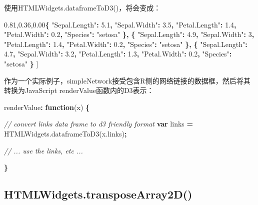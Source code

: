 \documentclass[]{book}
\newenvironment{Shaded}{\begin{snugshade}}{\end{snugshade}}
\newcommand{\KeywordTok}[1]{\textcolor[rgb]{0.13,0.29,0.53}{\textbf{#1}}}
\newcommand{\DecValTok}[1]{\textcolor[rgb]{0.00,0.00,0.81}{#1}}
\newcommand{\FloatTok}[1]{\textcolor[rgb]{0.00,0.00,0.81}{#1}}
\newcommand{\StringTok}[1]{\textcolor[rgb]{0.31,0.60,0.02}{#1}}
\newcommand{\CommentTok}[1]{\textcolor[rgb]{0.56,0.35,0.01}{\textit{#1}}}
\newcommand{\VariableTok}[1]{\textcolor[rgb]{0.00,0.00,0.00}{#1}}
\newcommand{\OperatorTok}[1]{\textcolor[rgb]{0.81,0.36,0.00}{\textbf{#1}}}
\newcommand{\AttributeTok}[1]{\textcolor[rgb]{0.77,0.63,0.00}{#1}}
\newcommand{\NormalTok}[1]{#1}
\theoremstyle{definition}
\theoremstyle{definition}
\theoremstyle{definition}
\theoremstyle{remark}
\begin{document}
使用HTMLWidgets.dataframeToD3()，将会变成：

\begin{Shaded}
\begin{Highlighting}[]
\NormalTok{[}
  \OperatorTok{\{}
    \StringTok{"Sepal.Length"}\OperatorTok{:} \FloatTok{5.1}\OperatorTok{,}
    \StringTok{"Sepal.Width"}\OperatorTok{:} \FloatTok{3.5}\OperatorTok{,}
    \StringTok{"Petal.Length"}\OperatorTok{:} \FloatTok{1.4}\OperatorTok{,}
    \StringTok{"Petal.Width"}\OperatorTok{:} \FloatTok{0.2}\OperatorTok{,}
    \StringTok{"Species"}\OperatorTok{:} \StringTok{"setosa"}
  \OperatorTok{\},}
  \OperatorTok{\{}
    \StringTok{"Sepal.Length"}\OperatorTok{:} \FloatTok{4.9}\OperatorTok{,}
    \StringTok{"Sepal.Width"}\OperatorTok{:} \DecValTok{3}\OperatorTok{,}
    \StringTok{"Petal.Length"}\OperatorTok{:} \FloatTok{1.4}\OperatorTok{,}
    \StringTok{"Petal.Width"}\OperatorTok{:} \FloatTok{0.2}\OperatorTok{,}
    \StringTok{"Species"}\OperatorTok{:} \StringTok{"setosa"}
  \OperatorTok{\},}
  \OperatorTok{\{}
    \StringTok{"Sepal.Length"}\OperatorTok{:} \FloatTok{4.7}\OperatorTok{,}
    \StringTok{"Sepal.Width"}\OperatorTok{:} \FloatTok{3.2}\OperatorTok{,}
    \StringTok{"Petal.Length"}\OperatorTok{:} \FloatTok{1.3}\OperatorTok{,}
    \StringTok{"Petal.Width"}\OperatorTok{:} \FloatTok{0.2}\OperatorTok{,}
    \StringTok{"Species"}\OperatorTok{:} \StringTok{"setosa"}
  \OperatorTok{\}}
\NormalTok{] }
\end{Highlighting}
\end{Shaded}

作为一个实际例子，simpleNetwork接受包含R侧的网络链接的数据框，然后将其转换为JavaScript
renderValue函数内的D3表示：

\begin{Shaded}
\begin{Highlighting}[]
\NormalTok{renderValue}\OperatorTok{:} \KeywordTok{function}\NormalTok{(x) }\OperatorTok{\{}

  \CommentTok{// convert links data frame to d3 friendly format}
  \KeywordTok{var}\NormalTok{ links }\OperatorTok{=} \VariableTok{HTMLWidgets}\NormalTok{.}\AttributeTok{dataframeToD3}\NormalTok{(}\VariableTok{x}\NormalTok{.}\AttributeTok{links}\NormalTok{)}\OperatorTok{;}
  
  \CommentTok{// ... use the links, etc ...}

\OperatorTok{\}}
\end{Highlighting}
\end{Shaded}

\subsection{HTMLWidgets.transposeArray2D()}\label{htmlwidgets.transposearray2d}
\end{document}
